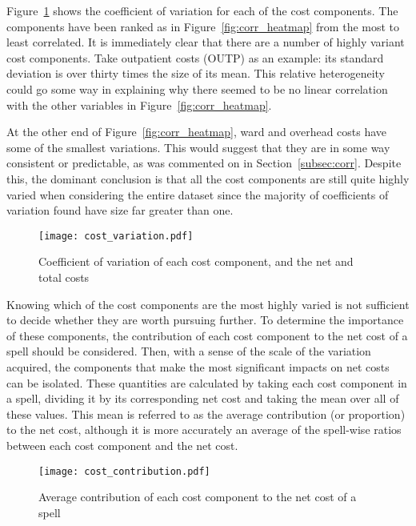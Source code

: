 Figure~\ref{fig:cost_variation} shows the coefficient of variation for each of
the cost components. The components have been ranked as in
Figure~\ref{fig:corr_heatmap} from the most to least correlated. It is
immediately clear that there are a number of highly variant cost components.
Take outpatient costs (OUTP) as an example: its standard deviation is over
thirty times the size of its mean. This relative heterogeneity could go some way
in explaining why there seemed to be no linear correlation with the other
variables in Figure~\ref{fig:corr_heatmap}.

At the other end of Figure~\ref{fig:corr_heatmap}, ward and overhead costs have
some of the smallest variations. This would suggest that they are in some way
consistent or predictable, as was commented on in Section~\ref{subsec:corr}.
Despite this, the dominant conclusion is that all the cost components are still
quite highly varied when considering the entire dataset since the majority of
coefficients of variation found have size far greater than one. 

\begin{figure}[h]
    \centering
    \texttt{[image: cost\_variation.pdf]}
    \caption{%
        Coefficient of variation of each cost component, and the net and total
        costs
    }\label{fig:cost_variation}
\end{figure}

Knowing which of the cost components are the most highly varied is not
sufficient to decide whether they are worth pursuing further. To determine the
importance of these components, the contribution of each cost component to the
net cost of a spell should be considered. Then, with a sense of the scale of the
variation acquired, the components that make the most significant impacts on net
costs can be isolated. These quantities are calculated by taking each cost
component in a spell, dividing it by its corresponding net cost and taking the
mean over all of these values. This mean is referred to as the average
contribution (or proportion) to the net cost, although it is more accurately an
average of the spell-wise ratios between each cost component and the net cost.

\begin{figure}[h]
    \centering
    \texttt{[image: cost\_contribution.pdf]}
    \caption{%
        Average contribution of each cost component to the net cost of a spell
    }\label{fig:cost_contribution}
\end{figure}

